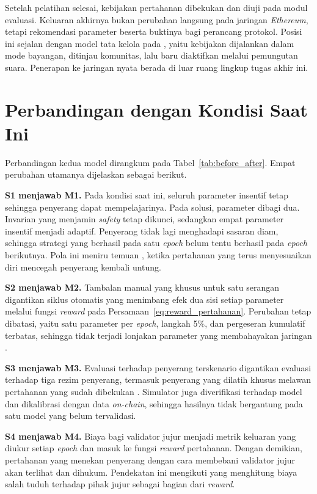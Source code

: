 Setelah pelatihan selesai, kebijakan pertahanan dibekukan dan diuji pada modul evaluasi. Keluaran akhirnya bukan perubahan langsung pada jaringan \textit{Ethereum}, tetapi rekomendasi parameter beserta buktinya bagi perancang protokol. Posisi ini sejalan dengan model tata kelola pada \textcite{skowronski2026adaptive}, yaitu kebijakan dijalankan dalam mode bayangan, ditinjau komunitas, lalu baru diaktifkan melalui pemungutan suara. Penerapan ke jaringan nyata berada di luar ruang lingkup tugas akhir ini.

\section{Perbandingan dengan Kondisi Saat Ini}
\label{sec:perbandingan_solusi}
Perbandingan kedua model dirangkum pada Tabel~\ref{tab:before_after}. Empat perubahan utamanya dijelaskan sebagai berikut.

\textbf{S1 menjawab M1.} Pada kondisi saat ini, seluruh parameter insentif tetap sehingga penyerang dapat mempelajarinya. Pada solusi, parameter dibagi dua. Invarian yang menjamin \textit{safety} tetap dikunci, sedangkan empat parameter insentif menjadi adaptif. Penyerang tidak lagi menghadapi sasaran diam, sehingga strategi yang berhasil pada satu \textit{epoch} belum tentu berhasil pada \textit{epoch} berikutnya. Pola ini meniru temuan \textcite{skowronski2026adaptive}, ketika pertahanan yang terus menyesuaikan diri mencegah penyerang kembali untung.

\textbf{S2 menjawab M2.} Tambalan manual yang khusus untuk satu serangan digantikan siklus otomatis yang menimbang efek dua sisi setiap parameter melalui fungsi \textit{reward} pada Persamaan~\eqref{eq:reward_pertahanan}. Perubahan tetap dibatasi, yaitu satu parameter per \textit{epoch}, langkah 5\%, dan pergeseran kumulatif terbatas, sehingga tidak terjadi lonjakan parameter yang membahayakan jaringan \parencite{skowronski2026adaptive}.

\textbf{S3 menjawab M3.} Evaluasi terhadap penyerang terskenario digantikan evaluasi terhadap tiga rezim penyerang, termasuk penyerang yang dilatih khusus melawan pertahanan yang sudah dibekukan \parencite{wushishi2026coadam}. Simulator juga diverifikasi terhadap model \textcite{laneve2025stochastic} dan dikalibrasi dengan data \textit{on-chain}, sehingga hasilnya tidak bergantung pada satu model yang belum tervalidasi.

\textbf{S4 menjawab M4.} Biaya bagi validator jujur menjadi metrik keluaran yang diukur setiap \textit{epoch} dan masuk ke fungsi \textit{reward} pertahanan. Dengan demikian, pertahanan yang menekan penyerang dengan cara membebani validator jujur akan terlihat dan dihukum. Pendekatan ini mengikuti \textcite{skowronski2026adaptive} yang menghitung biaya salah tuduh terhadap pihak jujur sebagai bagian dari \textit{reward}.

